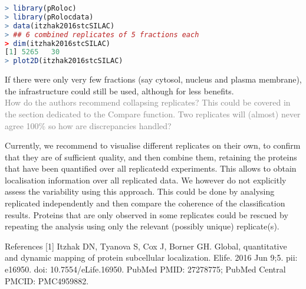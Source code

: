 \documentclass[11pt]{article}
\begin{document}
\small{
\begin{lstlisting}[language=R] 
> library(pRoloc)
> library(pRolocdata)
> data(itzhak2016stcSILAC)
> ## 6 combined replicates of 5 fractions each
> dim(itzhak2016stcSILAC)
[1] 5265   30
> plot2D(itzhak2016stcSILAC)
\end{lstlisting}}

If there were only very few fractions (say cytosol, nucleus and plasma membrane), the infrastructure could still be used, although for less benefits. \\


\textcolor{gray} {How do the authors recommend collapsing replicates? This could be covered in the section dedicated to the Compare function. Two replicates will (almost) never agree 100\% so how are discrepancies handled?}

Currently, we recommend to visualise different replicates on their own, to confirm that they are of sufficient quality, and then combine them, retaining the proteins that have been quantified over all replicatedd experiments. This allows to obtain localisation information over all replicated data. We however do not explicitly assess the variability using this approach. This could be done by analysing replicated independently and then compare the coherence of the classification results. Proteins that are only observed in some replicates could be rescued by repeating the analysis using only the relevant (possibly unique) replicate(s). \\ \newline


\small{References
[1] Itzhak DN, Tyanova S, Cox J, Borner GH. Global, quantitative and dynamic mapping of protein subcellular localization. Elife. 2016 Jun 9;5. pii: e16950.  doi: 10.7554/eLife.16950. PubMed PMID: 27278775; PubMed Central PMCID: PMC4959882.}
\end{document}
